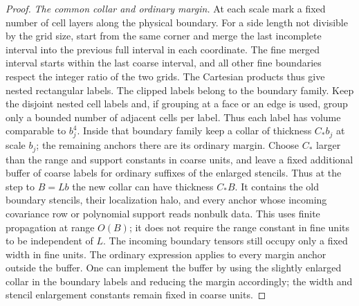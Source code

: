 \documentclass[11pt]{article}
\theoremstyle{definition}
\begin{document}
\begin{proof}
\emph{The common collar and ordinary margin.}
At each scale mark a fixed number of cell layers along the
physical boundary. For a side length not divisible by the grid
size, start from the same corner and merge the last incomplete
interval into the previous full interval in each coordinate.
The fine merged interval starts within the last coarse interval,
and all other fine boundaries respect the integer ratio of the
two grids. The Cartesian products thus give nested rectangular
labels. The clipped labels belong to the boundary family. Keep the disjoint nested cell labels and, if
grouping at a face or an edge is used, group only a bounded
number of adjacent cells per label. Thus each label has volume
comparable to \(b_j^4\). Inside that boundary family keep a
collar of thickness \(C_*b_j\) at scale \(b_j\); the remaining
anchors there are its ordinary margin. Choose \(C_*\) larger than the
range and support constants in coarse units, and leave a fixed
additional buffer of coarse labels for ordinary suffixes of
the enlarged stencils. Thus at the step to \(B=Lb\) the new
collar can have thickness \(C_*B\). It contains the old
boundary stencils, their localization halo, and every anchor
whose incoming covariance row or polynomial support reads
nonbulk data. This uses finite propagation at range \(O(B)\);
it does not require the range constant in fine units to be
independent of \(L\). The incoming boundary tensors still
occupy only a fixed width in fine units. The ordinary expression
applies to every margin anchor outside the buffer. One can
implement the buffer by using the slightly enlarged collar in
the boundary labels and reducing the margin accordingly;
the width and stencil enlargement constants remain fixed in
coarse units.


\end{proof}
\end{document}
